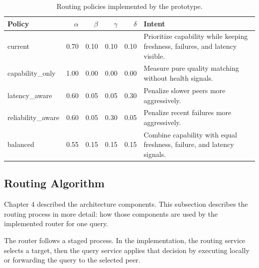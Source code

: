 \begin{table}[htbp]
\centering
\caption{Routing policies implemented by the prototype.}
\begin{tabularx}{\textwidth}{lrrrrX}
\toprule
\textbf{Policy} & \(\alpha\) & \(\beta\) & \(\gamma\) & \(\delta\) & \textbf{Intent} \\
\midrule
current & 0.70 & 0.10 & 0.10 & 0.10 & Prioritize capability while keeping freshness, failures, and latency visible. \\
capability\_only & 1.00 & 0.00 & 0.00 & 0.00 & Measure pure quality matching without health signals. \\
latency\_aware & 0.60 & 0.05 & 0.05 & 0.30 & Penalize slower peers more aggressively. \\
reliability\_aware & 0.60 & 0.05 & 0.30 & 0.05 & Penalize recent failures more aggressively. \\
balanced & 0.55 & 0.15 & 0.15 & 0.15 & Combine capability with equal freshness, failure, and latency signals. \\
\bottomrule
\end{tabularx}
\end{table}

\subsection{Routing Algorithm}

Chapter 4 described the architecture components. This subsection describes the
routing process in more detail: how those components are used by the
implemented router for one query.

The router follows a staged process. In the implementation, the routing service
selects a target, then the query service applies that decision by executing
locally or forwarding the query to the selected peer.

